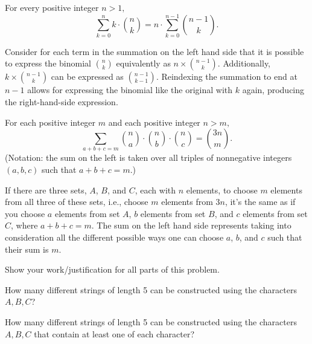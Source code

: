 \documentclass[11pt]{article}
\begin{document}
\begin{Parts}

\Part For every positive integer $n>1,$ 
\[\sum_{k=0}^n k \cdot \binom{n}{k} = n\cdot \sum_{k=0}^{n - 1}\binom{n - 1}{k}.\]

\begin{solution}
    Consider for each term in the summation on the left hand side that it is
    possible to express the binomial $\binom{n}{k}$ equivalently as $n\times 
    \binom{n-1}{k}$. Additionally, $k \times \binom{n-1}{k}$ can be expressed
    as $\binom{n-1}{k-1}$. Reindexing the summation to end at $n-1$ allows for
    expressing the binomial like the original with $k$ again, producing the 
    right-hand-side expression. 
\end{solution}

\Part For each positive integer $m$ and each positive integer $n > m,$
\[\sum_{a + b + c = m} \binom{n}{a}\cdot\binom{n}{b}\cdot\binom{n}{c} = \binom{3n}{m}.\]
(Notation: the sum on the left is taken over all triples of nonnegative integers 
$(a,b,c)$ such that $a + b + c = m.$)

\begin{solution}
    If there are three sets, $A$, $B$, and $C$, each with $n$ elements, to
    choose $m$ elements from all three of these sets, i.e., choose $m$ elements
    from $3n$, it's the same as if you choose $a$ elements from set $A$, $b$ 
    elements from set $B$, and $c$ elements from set $C$, where $a + b + c = m$.
    The sum on the left hand side represents taking into consideration all the 
    different possible ways one can choose $a$, $b$, and $c$ such that their
    sum is $m$.
\end{solution}

\end{Parts}


Show your work/justification for all parts of this problem.
\begin{Parts}
    \Part How many different strings of length 5 can be constructed using the 
    characters $A, B, C$?

    \Part How many different strings of length 5 can be constructed using the 
    characters $A, B, C$ that contain at least one of each character?

\end{Parts}
\end{document}
